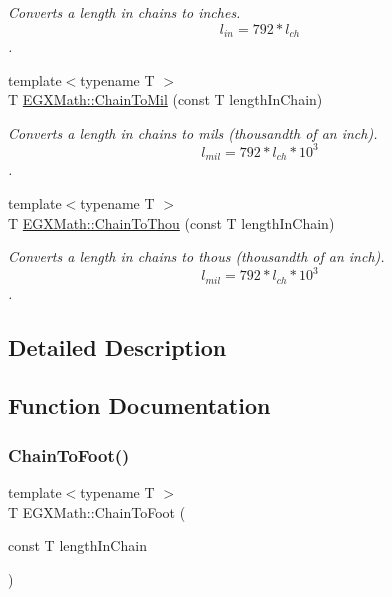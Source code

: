 \begin{DoxyCompactItemize}
\begin{DoxyCompactList}\small\item\em Converts a length in chains to inches. \[ l_{in}= 792 * l_{ch} \]. \end{DoxyCompactList}\item 
{\footnotesize template$<$typename T $>$ }\\T \mbox{\hyperlink{group___e_g_x_math-_conversions-_length_conversions-_surveyors-_chain-_imperial_gae1276611dce26e23deae1b0379b4394d}{E\+G\+X\+Math\+::\+Chain\+To\+Mil}} (const T length\+In\+Chain)
\begin{DoxyCompactList}\small\item\em Converts a length in chains to mils (thousandth of an inch). \[ l_{mil}=792 * l_{ch} * 10^{3} \]. \end{DoxyCompactList}\item 
{\footnotesize template$<$typename T $>$ }\\T \mbox{\hyperlink{group___e_g_x_math-_conversions-_length_conversions-_surveyors-_chain-_imperial_ga64cd46f80e3af5d7ca664456080ef6a3}{E\+G\+X\+Math\+::\+Chain\+To\+Thou}} (const T length\+In\+Chain)
\begin{DoxyCompactList}\small\item\em Converts a length in chains to thous (thousandth of an inch). \[ l_{mil}= 792 * l_{ch} * 10^{3} \]. \end{DoxyCompactList}\end{DoxyCompactItemize}


\subsection{Detailed Description}


\subsection{Function Documentation}
\mbox{\label{group___e_g_x_math-_conversions-_length_conversions-_surveyors-_chain-_imperial_gab1249a8d1535d07fcb4844d687133a49}} 
\subsubsection{\texorpdfstring{Chain\+To\+Foot()}{ChainToFoot()}}
{\footnotesize\ttfamily template$<$typename T $>$ \\
T E\+G\+X\+Math\+::\+Chain\+To\+Foot (\begin{DoxyParamCaption}\item[{const T}]{length\+In\+Chain }\end{DoxyParamCaption})}



